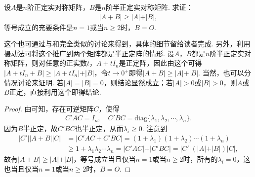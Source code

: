 \documentclass[../../main.tex]{subfiles}
\begin{document}
\begin{proposition}\label{proposition:例9.76}
设\(A\)是\(n\)阶正定实对称矩阵，\(B\)是\(n\)阶半正定实对称矩阵. 求证：
\begin{align*}
\vert A + B\vert\geq\vert A\vert+\vert B\vert,
\end{align*}
等号成立的充要条件是\(n = 1\)或当\(n\geq2\)时，\(B = O\).
\end{proposition}
\begin{remark}
这个也可通过与和完全类似的讨论来得到，具体的细节留给读者完成. 另外，利用摄动法可将这个推广到两个矩阵都是半正定阵的情形. 设\(A\)，\(B\)都是\(n\)阶半正定实对称矩阵，则对任意的正实数\(t\)，\(A + tI_n\)是正定阵，因此由这个可得\(\vert A + tI_n + B\vert\geq\vert A + tI_n\vert+\vert B\vert\)，令\(t\to0^+\)即得\(\vert A + B\vert\geq\vert A\vert+\vert B\vert\). 当然，也可以分情况讨论来证明. 若\(\vert A\vert=\vert B\vert = 0\)，则结论显然成立；若\(\vert A\vert>0\)或\(\vert B\vert>0\)，则\(A\)或\(B\)正定，直接利用这个即得结论.
\end{remark}
\begin{proof}
由可知，存在可逆矩阵\(C\)，使得
\begin{align*}
C'AC = I_n,\quad C'BC = \mathrm{diag}\{\lambda_1,\lambda_2,\cdots,\lambda_n\}.
\end{align*}
因为\(B\)半正定，故\(C'BC\)也半正定，从而\(\lambda_i\geq0\). 注意到
\begin{align*}
\vert C'\vert\vert A + B\vert\vert C\vert&=\vert C'AC + C'BC\vert=(1 + \lambda_1)(1 + \lambda_2)\cdots(1 + \lambda_n)\\
&\geq1 + \lambda_1\lambda_2\cdots\lambda_n=\vert C'AC\vert+\vert C'BC\vert=\vert C'\vert(\vert A\vert+\vert B\vert)\vert C\vert,
\end{align*}
故有\(\vert A + B\vert\geq\vert A\vert+\vert B\vert\)，等号成立当且仅当\(n = 1\)或当\(n\geq2\)时，所有的\(\lambda_i = 0\)，这也当且仅当\(n = 1\)或当\(n\geq2\)时，\(B = O\).
\end{proof}
\end{document}
